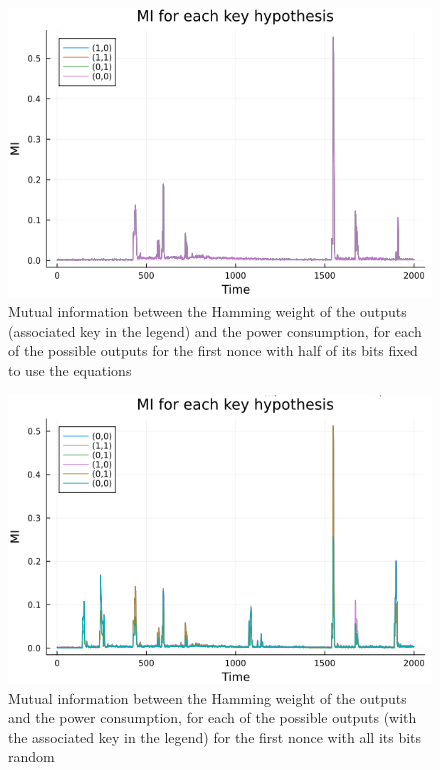 \documentclass[11pt,technote]{IEEEtran}
\begin{document}
		\begin{figure}[h]
			\centering
			\includegraphics[scale=0.4]{img_files/nonces_half_fixed}
			\caption{Mutual information between the Hamming weight of the outputs (associated key in the legend) and the power consumption, for each of the possible outputs for the first nonce with half of its bits fixed to use the equations}
			\label{half_fixed}
		\end{figure}
		
		\begin{figure}[h]
			\centering
			\includegraphics[scale=0.4]{img_files/nonces_alea}
			\caption{Mutual information between the Hamming weight of the outputs and the power consumption, for each of the possible outputs (with the associated key in the legend) for the first nonce with all its bits random}
			\label{all_alea}
		\end{figure}
		
\end{document}
